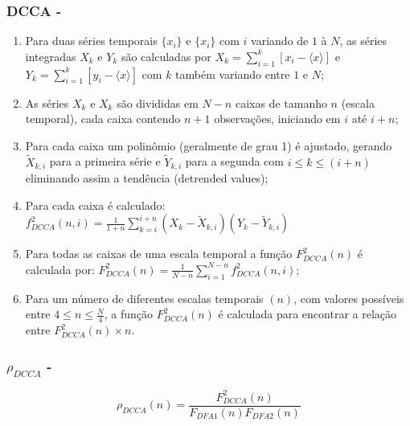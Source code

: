 \documentclass[11pt, aspectratio=169]{beamer}
\newcommand{\pdcca}{\({\rho}_{DCCA}\) }
\begin{document}
\begin{frame}
  \frametitle{DCCA - \cite{Podobnik2008}}
  \begin{enumerate}
    \label{list:dcca}
    \item Para duas séries temporais \(\{x_{i}\}\) e \(\{x_{i}\}\) com  \(i\) variando de  \(1\) à \(N\), as séries integradas \(X_{k}\) e \(Y_{k}\) são calculadas por \(X_{k} = \sum_{i=1}^{k}\left[x_{i} - \langle x \rangle \right] \) e \(Y_{k} = \sum_{i=1}^{k}\left[y_{i} - \langle x \rangle \right] \) com \(k\) também variando entre \(1\) e \(N\);
    \item As séries  \(X_{k}\) e \(X_{k}\) são divididas em \(N - n\) caixas de tamanho \(n\) (escala temporal), cada caixa contendo \(n + 1\) observações, iniciando em \(i\) até \(i + n\);
    \item Para cada caixa um polinômio (geralmente de grau 1) é ajustado, gerando \(\widetilde{X}_{k, i}\) para a primeira série e \(\widetilde{Y}_{k, i}\) para a segunda com \( i \le k \le (i + n) \) eliminando assim a tendência (detrended values);
    \item  Para cada caixa é calculado: $f_{DCCA}^{2}(n, i) = \frac{1}{1+n} \sum_{k=i}^{i + n}(X_{k}-\widetilde{X}_{k, i})(Y_{k}-\widetilde{Y}_{k, i})$
    \item Para todas as caixas de uma escala temporal a função $F_{DCCA}^{2}(n)$ é calculada por: $F_{DCCA}^{2}(n) = \frac{1}{N-n} \sum_{i=1}^{N-n} f_{DCCA}^{2}(n, i)$;
    \item Para um número de diferentes escalas temporais $(n)$, com valores possíveis entre \( 4 \le n \le \frac{N}{4}\), a função $F_{DCCA}^{2}(n)$ é calculada para encontrar a relação entre $F_{DCCA}^{2}(n) \times n$.
  \end{enumerate}

\end{frame}

\begin{frame}
  \frametitle{\pdcca - \cite{Zebende2011}}

  \begin{equation}
    \label{eq_pdcca}
    \rho_{DCCA}(n) = \frac{F_{DCCA}^2 (n)}{ F_{DFA1} (n) F_{DFA2} (n)}
  \end{equation}

\end{frame}
\end{document}
